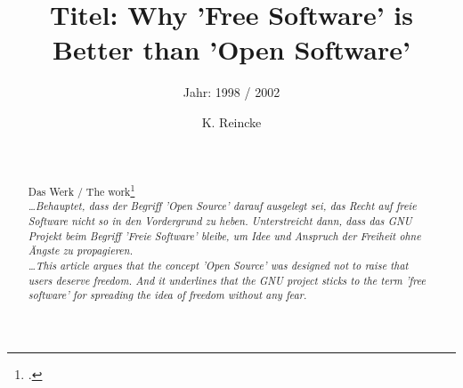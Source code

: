 \documentclass[DIV=calc,BCOR=5mm,11pt,headings=small,oneside,abstract=true, toc=bib]{scrartcl}
\begin{document}

\titlehead{Literaturexzerpt}
\subject{Autor(en): Stallman / Stallman1998a}
\title{Titel: Why 'Free Software' is Better than 'Open Software'}
\subtitle{Jahr: 1998 / 2002 }
\author{K. Reincke}

\maketitle

\begin{abstract}
\noindent
\cite[(in:)][]{StaGay2002a} \\
\noindent
\cite[(ist:)][]{Stallman1998a} \\
Das Werk / The work\footcite[][]{Stallman1998a} \\
\noindent \itshape
\ldots Behauptet, dass der Begriff 'Open Source' darauf ausgelegt sei, das Recht
auf freie Software nicht so in den Vordergrund zu heben. Unterstreicht dann,
dass das GNU Projekt beim Begriff 'Freie Software' bleibe, um Idee und Anspruch
der Freiheit ohne Ängste zu propagieren.
\\
\noindent
\ldots This article argues that the concept 'Open Source' was designed not to
raise that users deserve freedom. And it underlines that the GNU project sticks
to the term 'free software' for spreading the idea of freedom without any fear.
\end{abstract}
\footnotesize
\normalsize
\end{document}
